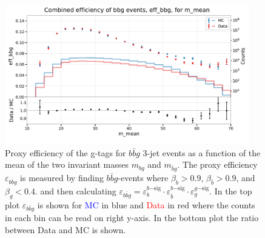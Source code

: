 \documentclass[a4paper, twoside, nobib]{tufte-book}
\begin{document}
\begin{figure}
  \includegraphics[width=0.95\textwidth, trim=0 0 0 40, clip]{figures/quarks/eff_bbg_m_mean-down_sample=1.00-ML_vars=vertex-selection=b-ejet_min=4-n_iter_RS_lgb=99-n_iter_RS_xgb=9-cdot_cut=0.90-version=19.pdf}
  \caption[g-Tagging proxy efficiency for $b\bar{b}g$-events as function of the mean invariant mass]
          {Proxy efficiency of the g-tags for $b\bar{b}g$ 3-jet events as a function of the mean of the two invariant masses $m_{bg}$ and $m_{\bar{b}g}$. The proxy efficiency $\varepsilon_{b\bar{b}g}$ is measured by finding $b\bar{b}g$-events where $\beta_b > 0.9$, $\beta_{\bar{b}}>0.9$, and $\beta_g < 0.4$. and then calculating  $\varepsilon_{b\bar{b}g} = \varepsilon_b^{b\mathrm{-sig}} \cdot \varepsilon_{\bar{b}}^{b\mathrm{-sig}} \cdot  \varepsilon_g^{g\mathrm{-sig}} $. In the top plot $\varepsilon_{b\bar{b}g}$ is shown for \textcolor{blue}{MC} in blue and \textcolor{red}{Data} in red where the counts in each bin can be read on right y-axis. In the bottom plot the ratio between Data and MC is shown.
          } 
  \label{fig:q:effiency_btag_bbg_m_mean}
\end{figure}
\end{document}
